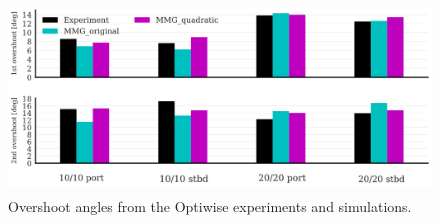 \begin{figure}[b!]
    \centering
    \includegraphics[width=0.9\linewidth, height = 5cm]{figures/results_optiwise_overshoot.png}
    \caption{Overshoot angles from the Optiwise experiments and simulations.}
    \label{fig:overshoots_optiwise}
\end{figure}
\vspace{-0.5cm}
%          
%          
     

